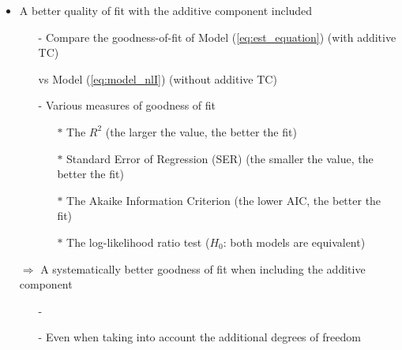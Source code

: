 \documentclass[10 pt,Helvetica, french]{beamer}
\begin{document}
\begin{frame}[label=slide_goodnessfit]
\begin{itemize}
\item A better quality of fit with the additive component included \vspace{0.2cm}
\begin{itemize}
\item[-] Compare the goodness-of-fit of Model (\ref{eq:est_equation}) (with additive TC)  \vspace{0.1cm}
\item[ ] vs Model (\ref{eq:model_nlI}) (without additive TC) \vspace{0.1cm}
\item[-] Various measures of goodness of fit \vspace{0.1cm}
\begin{itemize}
\item[$\ast$] The $R^2$ (the larger the value, the better the fit) \vspace{0.1cm}
\item[$\ast$] Standard Error of Regression (SER) (the smaller the value, the better the fit) \vspace{0.1cm}
\item[$\ast$] The Akaike Information Criterion (the lower AIC, the better the fit) \vspace{0.1cm}
\item[$\ast$] The log-likelihood ratio test ($H_0$: both models are equivalent) \vspace{0.1cm}
\end{itemize}
\end{itemize}
\item[$\Rightarrow$] A systematically better goodness of fit when including the additive component  \vspace{0.1cm}

\begin{itemize}
\item[-] \hyperlink{app_goodnessfit}{} \vspace{0.1cm}
\item[-] Even when taking into account the additional degrees of freedom
\end{itemize}
\end{itemize}
\end{frame}
\end{document}

